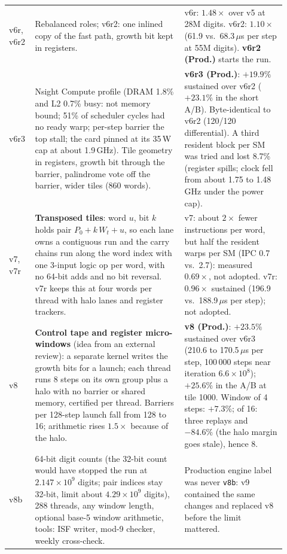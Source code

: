 \documentclass[11pt,a4paper]{article}
\newcommand{\code}[1]{\texttt{\small #1}}
\theoremstyle{remark}
\begin{document}
\begin{longtable}{@{}p{0.075\linewidth}p{0.50\linewidth}p{0.34\linewidth}@{}}
v6r, v6r2 & Rebalanced roles; v6r2: one inlined copy of the fast path, growth bit kept in registers. & v6r: $1.48\times$ over v5 at 28M digits. v6r2: $1.10\times$ (61.9 vs.\ 68.3\,$\mu$s per step at 55M digits). \textbf{v6r2 (Prod.)} starts the run.\\
v6r3 & Nsight Compute profile (DRAM 1.8\% and L2 0.7\% busy: not memory bound; 51\% of scheduler cycles had no ready warp; per-step barrier the top stall; the card pinned at its 35\,W cap at about 1.9\,GHz). Tile geometry in registers, growth bit through the barrier, palindrome vote off the barrier, wider tiles (860 words). & \textbf{v6r3 (Prod.)}: $+19.9\%$ sustained over v6r2 ($+23.1\%$ in the short A/B). Byte-identical to v6r2 (120/120 differential). A third resident block per SM was tried and lost 8.7\% (register spills; clock fell from about 1.75 to 1.48\,GHz under the power cap).\\
v7, v7r & \textbf{Transposed tiles}: word $u$, bit $k$ holds pair $P_0+k\,W_t+u$, so each lane owns a contiguous run and the carry chains run along the word index with one 3-input logic op per word, with no 64-bit adds and no bit reversal. v7r keeps this at four words per thread with halo lanes and register trackers. & v7: about $2\times$ fewer instructions per word, but half the resident warps per SM (IPC 0.7 vs.\ 2.7): measured $0.69\times$, not adopted. v7r: $0.96\times$ sustained (196.9 vs.\ 188.9\,$\mu$s per step); not adopted.\\
v8 & \textbf{Control tape and register micro-windows} (idea from an external review): a separate kernel writes the growth bits for a launch; each thread runs 8 steps on its own group plus a halo with no barrier or shared memory, certified per thread. Barriers per 128-step launch fall from 128 to 16; arithmetic rises $1.5\times$ because of the halo. & \textbf{v8 (Prod.)}: $+23.5\%$ sustained over v6r3 (210.6 to 170.5\,$\mu$s per step, 100\,000 steps near iteration $6.6\times10^8$); $+25.6\%$ in the A/B at tile 1000. Window of 4 steps: $+7.3\%$; of 16: three replays and $-84.6\%$ (the halo margin goes stale), hence 8.\\
v8b & 64-bit digit counts (the 32-bit count would have stopped the run at $2.147\times10^9$ digits; pair indices stay 32-bit, limit about $4.29\times10^9$ digits), 288 threads, any window length, optional base-5 window arithmetic, tools: ISF writer, mod-9 checker, weekly cross-check. & Production engine label was never \code{v8b}: v9 contained the same changes and replaced v8 before the limit mattered.\\

\end{longtable}
\end{document}
